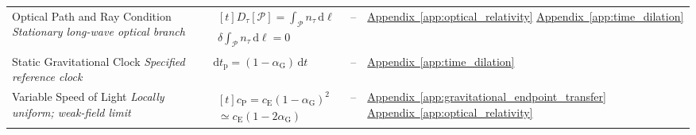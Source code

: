 \begin{longtable}{@{} p{4.5cm} p{6cm} c p{4cm} @{}}
{\raggedright Optical Path and Ray Condition \newline \textit{Stationary long-wave optical branch}\par} & {\raggedright $\begin{gathered}[t]D_\tau[\mathcal P]=\int_{\mathcal P}n_\tau\,\mathrm d\ell \\ \delta\!\int_{\mathcal P}n_\tau\,\mathrm d\ell=0\end{gathered}$\par} & -- & {\raggedright \hyperref[app:optical_relativity]{Appendix~\ref*{app:optical_relativity}} \newline \hyperref[app:time_dilation]{Appendix~\ref*{app:time_dilation}}\par} \\

{\raggedright Static Gravitational Clock \newline \textit{Specified reference clock}\par} & {\raggedright $\mathrm dt_{\mathrm p}=(1-\alpha_{\mathrm G})\,\mathrm dt$\par} & -- & {\raggedright \hyperref[app:time_dilation]{Appendix~\ref*{app:time_dilation}}\par} \\

{\raggedright Variable Speed of Light \newline \textit{Locally uniform; weak-field limit}\par} & {\raggedright $\begin{gathered}[t]c_{\mathrm P}=c_{\mathrm E}(1-\alpha_{\mathrm G})^2 \\ \simeq c_{\mathrm E}(1-2\alpha_{\mathrm G})\end{gathered}$\par} & -- & {\raggedright \hyperref[app:gravitational_endpoint_transfer]{Appendix~\ref*{app:gravitational_endpoint_transfer}} \newline \hyperref[app:optical_relativity]{Appendix~\ref*{app:optical_relativity}}\par} \\


\end{longtable}
